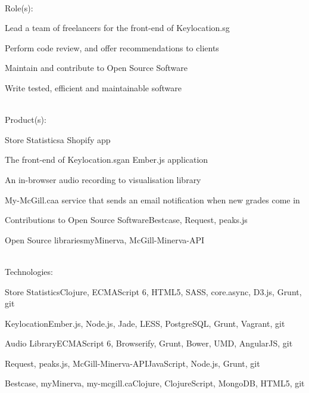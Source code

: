 \documentclass[letterpaper]{deedy-resume} %
\begin{document}


\\[\fpeval{\baseheight*\golden}]

Role(s):

\begin{tightitemize}
    \item Lead a team of freelancers for the front-end of Keylocation.sg
    \item Perform code review, and offer recommendations to clients
    \item Maintain and contribute to Open Source Software
    \item Write tested, efficient and maintainable software
\end{tightitemize}

\\[\fpeval{\baseheight*\golden}]

Product(s):
\begin{tightitemize}
    \item Store Statistics\textemdash a Shopify app
    \item The front-end of Keylocation.sg\textemdash an Ember.js application
    \item An in-browser audio recording to visualisation library
    \item My-McGill.ca\textemdash a service that sends an email notification when new grades come in
    \item Contributions to Open Source Software\textemdash Bestcase, Request, peaks.js
    \item Open Source libraries\textemdash myMinerva, McGill-Minerva-API
\end{tightitemize}

\\[\fpeval{\baseheight*\golden}]

Technologies: \\
\begin{tightitemize}
    \item Store Statistics\textemdash Clojure, ECMAScript 6, HTML5, SASS, core.async, D3.js, Grunt, git
    \item Keylocation\textemdash Ember.js, Node.js, Jade, LESS, PostgreSQL, Grunt, Vagrant, git
    \item Audio Library\textemdash ECMAScript 6, Browserify, Grunt, Bower, UMD, AngularJS, git
    \item Request, peaks.js, McGill-Minerva-API\textemdash JavaScript, Node.js, Grunt, git
    \item Bestcase, myMinerva, my-mcgill.ca\textemdash Clojure, ClojureScript, MongoDB, HTML5, git
\end{tightitemize}
\end{document}
